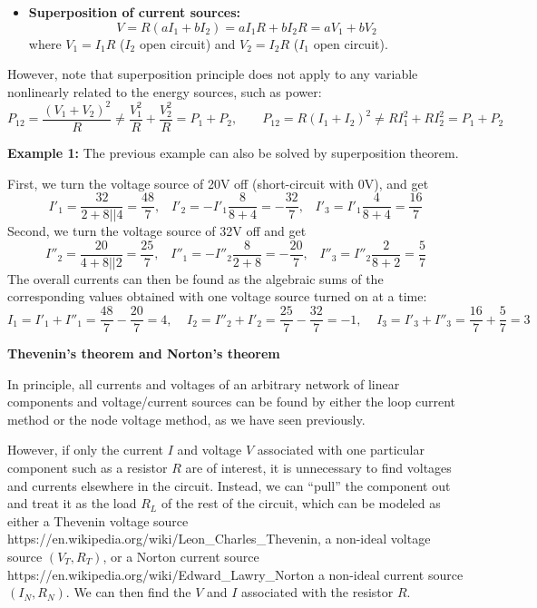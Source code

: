 \begin{itemize}
\begin{itemize}
\item {\bf Superposition of current sources:}
  \[	V=R(aI_1+bI_2)=aI_1R+bI_2R=aV_1+bV_2 \]
  where $V_1=I_1R$ ($I_2$ open circuit) and $V_2=I_2R$ ($I_1$ open circuit).
\end{itemize}

However, note that superposition principle does not apply to any variable
nonlinearly related to the energy sources, such as power:
\[
P_{12}=\frac{(V_1+V_2)^2}{R}\ne\frac{V_1^2}{R}+\frac{V_2^2}{R}=P_1+P_2,
\;\;\;\;\;\;\;
P_{12}=R(I_1+I_2)^2 \ne RI_1^2+RI_2^2=P_1+P_2	
\]

{\bf Example 1:} The previous example can also be solved by superposition 
theorem. 


First, we turn the voltage source of 20V off (short-circuit with 0V), and get
\[ 
I'_1=\frac{32}{2+8 || 4}=\frac{48}{7},\;\;\;I'_2=-I'_1\frac{8}{8+4}=-\frac{32}{7},
\;\;\;I'_3=I'_1\frac{4}{8+4}=\frac{16}{7} 
\]
Second, we turn the voltage source of 32V off and get
\[
I''_2=\frac{20}{4+8 || 2}=\frac{25}{7},\;\;\;I''_1=-I''_2\frac{8}{2+8}=-\frac{20}{7},
\;\;\;I''_3=I''_2\frac{2}{8+2}=\frac{5}{7} 
\]
The overall currents can then be found as the algebraic sums of the
corresponding values obtained with one voltage source turned on at a time:
\[ 
I_1=I'_1+I''_1=\frac{48}{7}-\frac{20}{7}=4,\;\;\;\;
I_2=I''_2+I'_2=\frac{25}{7}-\frac{32}{7}=-1,\;\;\;\;
I_3=I'_3+I''_3=\frac{16}{7}+\frac{5}{7}=3 
\]

{\bf Thevenin's theorem and Norton's theorem}

In principle, all currents and voltages of an arbitrary network of linear 
components and voltage/current sources can be found by either the loop 
current method or the node voltage method, as we have seen previously.

However, if only the current $I$ and voltage $V$ associated with one 
particular component such as a resistor $R$ are of interest, it is 
unnecessary to find voltages and currents elsewhere in the circuit. 
Instead, we can ``pull'' the component out and treat it as the load 
$R_L$ of the rest of the circuit, which can be modeled as either a 
Thevenin voltage source 
{https://en.wikipedia.org/wiki/Leon_Charles_Thevenin}, a non-ideal 
voltage source $(V_T, R_T)$, or a Norton current source
{https://en.wikipedia.org/wiki/Edward_Lawry_Norton} a non-ideal 
current source $(I_N, R_N)$. We can then find the $V$ and $I$ 
associated with the resistor $R$.


\end{itemize}
